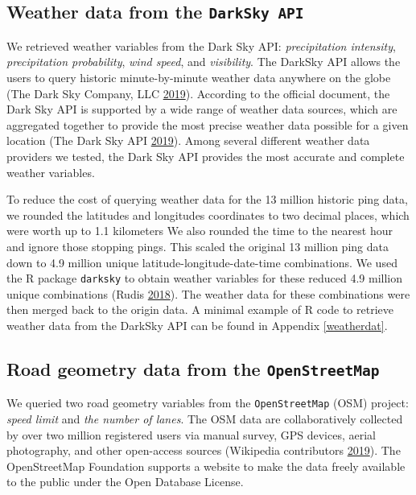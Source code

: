 \documentclass[12pt]{book}
\numberwithin{equation}{chapter}
\begin{document}
\hypertarget{weather-data-from-the-darksky-api}{%
\subsection{\texorpdfstring{Weather data from the \texttt{DarkSky\ API}}{Weather data from the DarkSky API}}\label{weather-data-from-the-darksky-api}}

We retrieved weather variables from the Dark Sky API: \emph{precipitation intensity}, \emph{precipitation probability}, \emph{wind speed}, and \emph{visibility}.
The DarkSky API allows the users to query historic minute-by-minute weather data anywhere on the globe (The Dark Sky Company, LLC \protect\hyperlink{ref-darksky}{2019}).
According to the official document, the Dark Sky API is supported by a wide range of weather data sources, which are aggregated together to provide the most precise weather data possible for a given location (The Dark Sky API \protect\hyperlink{ref-darkskyds}{2019}).
Among several different weather data providers we tested, the Dark Sky API provides the most accurate and complete weather variables.

To reduce the cost of querying weather data for the 13 million historic ping data, we rounded the latitudes and longitudes coordinates to two decimal places, which were worth up to 1.1 kilometers
We also rounded the time to the nearest hour and ignore those stopping pings.
This scaled the original 13 million ping data down to 4.9 million unique latitude-longitude-date-time combinations.
We used the R package \texttt{darksky} to obtain weather variables for these reduced 4.9 million unique combinations (Rudis \protect\hyperlink{ref-hrbrmstr}{2018}).
The weather data for these combinations were then merged back to the origin data.
A minimal example of R code to retrieve weather data from the DarkSky API can be found in Appendix \ref{weatherdat}.

\hypertarget{road-geometry-data-from-the-openstreetmap}{%
\subsection{\texorpdfstring{Road geometry data from the \texttt{OpenStreetMap}}{Road geometry data from the OpenStreetMap}}\label{road-geometry-data-from-the-openstreetmap}}

We queried two road geometry variables from the \texttt{OpenStreetMap} (OSM) project: \emph{speed limit} and \emph{the number of lanes}.
The OSM data are collaboratively collected by over two million registered users via manual survey, GPS devices, aerial photography, and other open-access sources (Wikipedia contributors \protect\hyperlink{ref-wikiOSM}{2019}).
The OpenStreetMap Foundation supports a website to make the data freely available to the public under the Open Database License.
\end{document}
